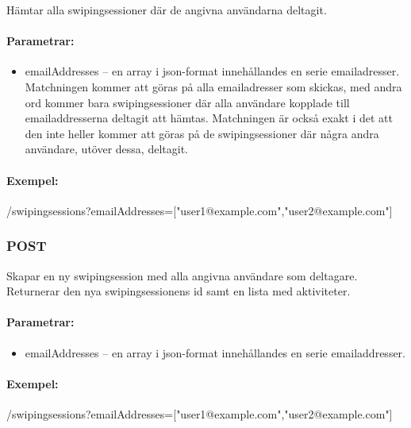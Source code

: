 \documentclass{article}
\begin{document}
Hämtar alla swipingsessioner där de angivna användarna deltagit.

\paragraph{Parametrar:}

\begin{itemize}
	
	\item emailAddresses -- en array i json-format innehållandes en serie emailadresser. Matchningen kommer att göras på alla
		emailadresser som skickas, med andra ord kommer bara swipingsessioner där alla användare kopplade till emailaddresserna
		deltagit att hämtas. Matchningen är också exakt i det att den inte heller kommer att göras på de swipingsessioner där
		några andra användare, utöver dessa, deltagit.

\end{itemize}

\paragraph{Exempel:} /swipingsessions?emailAddresses=["user1@example.com","user2@example.com"] 

\subsubsection*{POST}

Skapar en ny swipingsession med alla angivna användare som deltagare. Returnerar den nya swipingsessionens id samt en lista med aktiviteter.

\paragraph{Parametrar:}

\begin{itemize}		

	\item emailAddresses -- en array i json-format innehållandes en serie emailaddresser.			

\end{itemize}		

\paragraph{Exempel:} /swipingsessions?emailAddresses=["user1@example.com","user2@example.com"] 
\end{document}
